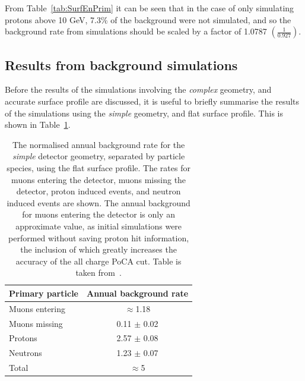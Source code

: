 From Table~\ref{tab:SurfEnPrim} it can be seen that in the case of only simulating protons above 10 GeV, 7.3\% of the background were not simulated, and so the background rate from simulations should be scaled by a factor of 1.0787 $\left(\frac{1}{0.927}\right)$. \\

\subsection{Results from background simulations}
Before the results of the simulations involving the \emph{complex} geometry, and accurate surface profile are discussed, it is useful to briefly summarise the results of the simulations using the \emph{simple} geometry, and flat surface profile. This is shown in Table~\ref{tab:SimpSurfRates}. \\
\begin{table}
  \caption[The normalised annual background rate for the \emph{simple} detector geometry, using the flat surface profile]
          {The normalised annual background rate for the \emph{simple} detector geometry, separated by particle species, using the flat surface profile. The rates for muons entering the detector, muons missing the detector, proton induced events, and neutron induced events are shown. The annual background for muons entering the detector is only an approximate value, as initial simulations were performed without saving proton hit information, the inclusion of which greatly increases the accuracy of the all charge PoCA cut. Table is taken from~\citep{MartinsThesis}.}
  \centering
  \label{tab:SimpSurfRates}
  \begin{tabular}{l c}
    \toprule
        {Primary particle} & {Annual background rate}  \\ 
        \midrule
        Muons entering     & $\approx$1.18             \\

        Muons missing      & 0.11 $\pm$ 0.02           \\

        Protons            & 2.57 $\pm$ 0.08           \\

        Neutrons           & 1.23 $\pm$ 0.07           \\

        Total              & $\approx$5                \\
    \bottomrule
  \end{tabular}
\end{table}

